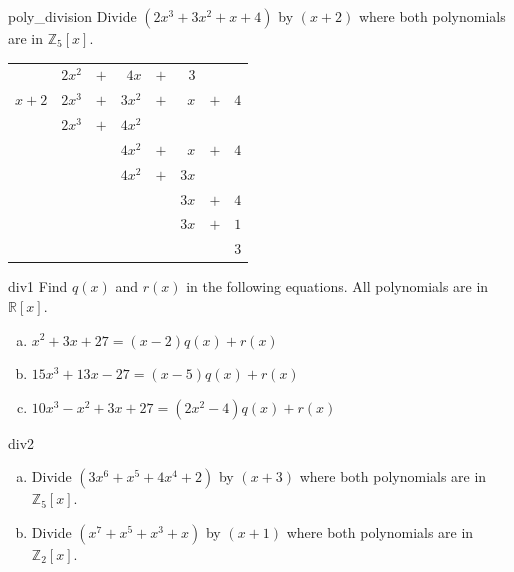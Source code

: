 \begin{example}{poly_division} 
Divide $(2x^3+3x^2+x+4)$ by $(x+2)$ where  both polynomials are in $\mathbb{Z}_5[x]$.
\begin{center}
\begin{tabular}{rrcrcrcr}
        &  $2x^2$  &  $+$  &      $4x$  &  $+$  &    $3$  &       &       \\ \cline{2-8}
 \multicolumn{1}{r|}{$x + 2$}
        &  $2x^3$  &  $+$  &    $3x^2$  &  $+$  & $ x$  &  $+$  &  $4$  \\
        &  $2x^3$  &  $+$  &    $4 x^2$  &       &         &       &       \\ \cline{2-8}
        &         &       &                $4x^2$  & $+$  &  $ x$  &  $+$  &  $4$  \\
        &         &       &                $4x^2$  &  $+$  & $ 3x$  &       &       \\ \cline{4-8}
        &         &       &           &       &                         $3 x$  & $+$  & $4$  \\
        &         &       &           &       &                          $3x$  & $+$  & $1$  \\ \cline{6-8}
        &         &       &           &       &         &       &                               $3$
\end{tabular}
\end{center}
\end{example}

 
\begin{exercise}{div1}
Find $q(x)$ and $r(x)$ in the following equations. All polynomials are in $\mathbb{R}[x]$.
\begin{enumerate} [(a)]
\item $x^2+3x+27=(x-2)q(x) + r(x)$
\item $15x^3+13x-27=(x-5)q(x) + r(x)$
\item $10x^3 - x^2+3x+27=(2x^2-4)q(x) + r(x)$
\end {enumerate}
\end {exercise}

\begin{exercise}{div2}
\begin{enumerate} [(a)]
\item Divide  $ ( 3x^6 + x^5 +4x^4 +2)$  by $ ( x+3) $ where both polynomials are in  $\mathbb{Z}_5[x]$.
\item Divide $ (x^7 + x^5 + x^3 + x)$  by $ ( x + 1 ) $ where both polynomials are in $ \mathbb{Z}_2[x]$.
\end {enumerate}
\end {exercise}


